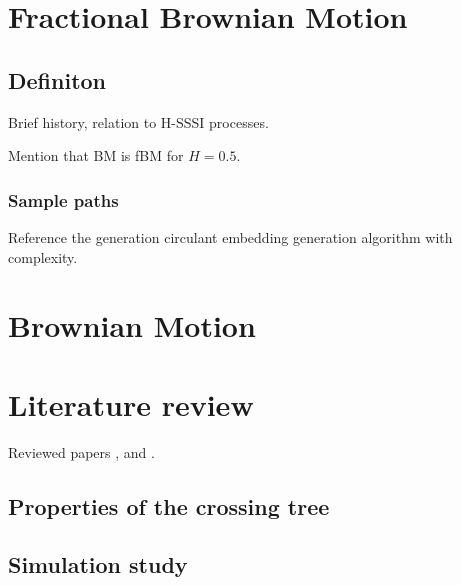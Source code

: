 \documentclass[a4paper]{report}
\begin{document}

\section{Fractional Brownian Motion} %
\label{sec:fractional_brownian_motion}

\subsection{Definiton} %
\label{sub:definiton}
Brief history, relation to H-SSSI processes.

Mention that BM is fBM for $H=0.5$.

\subsubsection{Sample paths} %
\label{ssub:sample_paths}

Reference the generation circulant embedding generation algorithm with complexity.




\section{Brownian Motion} %
\label{sec:brownian_motion}

\section{Literature review} %
\label{sec:literature_review}
Reviewed papers \cite{jones2004}, \cite{jonesshen2005} and \cite{decrouez2013}.


\subsection{Properties of the crossing tree} %
\label{sub:properties_of_the_crossing_tree}


\subsection{Simulation study} %
\label{sub:simulation_study_bm}
\end{document}
